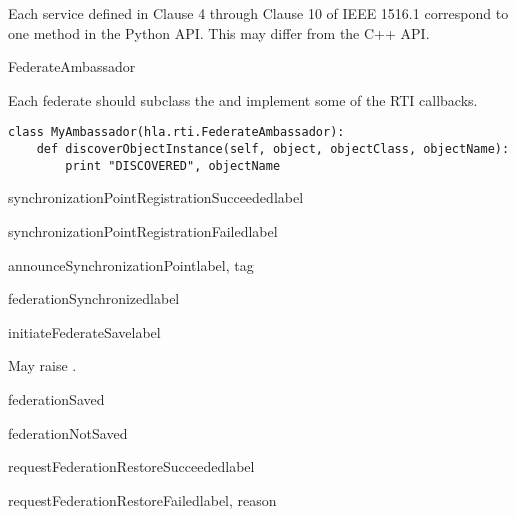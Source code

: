Each service defined in Clause 4 through Clause 10 of IEEE 1516.1 correspond to
one method in the Python API. This may differ from the C++ API.

\begin{classdesc}{FederateAmbassador}{}

Each federate should subclass the  and implement some
of the RTI callbacks.
\begin{verbatim}
class MyAmbassador(hla.rti.FederateAmbassador):
    def discoverObjectInstance(self, object, objectClass, objectName):
        print "DISCOVERED", objectName
\end{verbatim}

\medskip
{}

\begin{methoddesc}{synchronizationPointRegistrationSucceeded}{label}
\end{methoddesc}

\begin{methoddesc}{synchronizationPointRegistrationFailed}{label}
\end{methoddesc}

\begin{methoddesc}{announceSynchronizationPoint}{label, tag}
\end{methoddesc}

\begin{methoddesc}{federationSynchronized}{label}
\end{methoddesc}

\begin{methoddesc}{initiateFederateSave}{label}

May raise
.
\end{methoddesc}

\begin{methoddesc}{federationSaved}{}
\end{methoddesc}

\begin{methoddesc}{federationNotSaved}{}
\end{methoddesc}

\begin{methoddesc}{requestFederationRestoreSucceeded}{label}
\end{methoddesc}

\begin{methoddesc}{requestFederationRestoreFailed}{label, reason}
\end{methoddesc}


\end{classdesc}
